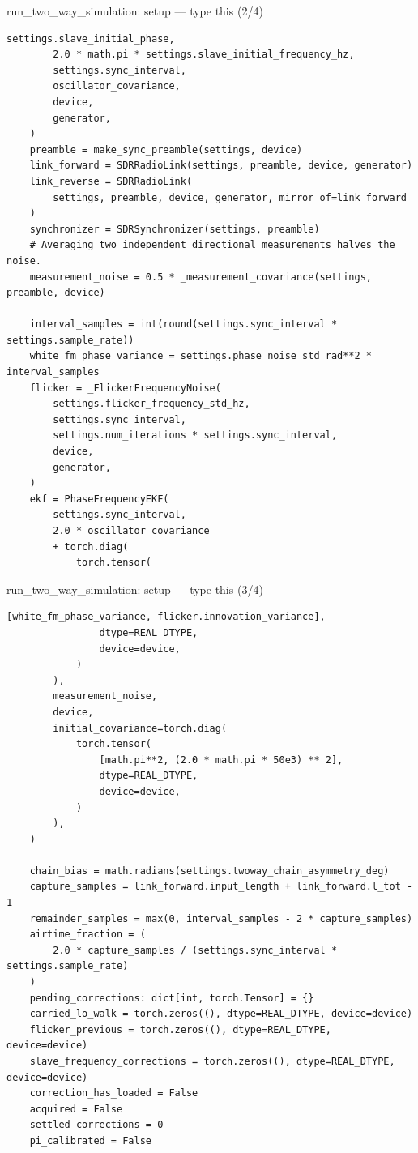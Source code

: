 \documentclass[10pt]{beamer}
\begin{document}
\begin{frame}[fragile]{run\_two\_way\_simulation: setup --- type this (2/4)}
\begin{lstlisting}[basicstyle=\ttfamily\tiny]
        settings.slave_initial_phase,
        2.0 * math.pi * settings.slave_initial_frequency_hz,
        settings.sync_interval,
        oscillator_covariance,
        device,
        generator,
    )
    preamble = make_sync_preamble(settings, device)
    link_forward = SDRRadioLink(settings, preamble, device, generator)
    link_reverse = SDRRadioLink(
        settings, preamble, device, generator, mirror_of=link_forward
    )
    synchronizer = SDRSynchronizer(settings, preamble)
    # Averaging two independent directional measurements halves the noise.
    measurement_noise = 0.5 * _measurement_covariance(settings, preamble, device)

    interval_samples = int(round(settings.sync_interval * settings.sample_rate))
    white_fm_phase_variance = settings.phase_noise_std_rad**2 * interval_samples
    flicker = _FlickerFrequencyNoise(
        settings.flicker_frequency_std_hz,
        settings.sync_interval,
        settings.num_iterations * settings.sync_interval,
        device,
        generator,
    )
    ekf = PhaseFrequencyEKF(
        settings.sync_interval,
        2.0 * oscillator_covariance
        + torch.diag(
            torch.tensor(
\end{lstlisting}
\end{frame}

\begin{frame}[fragile]{run\_two\_way\_simulation: setup --- type this (3/4)}
\begin{lstlisting}[basicstyle=\ttfamily\tiny]
                [white_fm_phase_variance, flicker.innovation_variance],
                dtype=REAL_DTYPE,
                device=device,
            )
        ),
        measurement_noise,
        device,
        initial_covariance=torch.diag(
            torch.tensor(
                [math.pi**2, (2.0 * math.pi * 50e3) ** 2],
                dtype=REAL_DTYPE,
                device=device,
            )
        ),
    )

    chain_bias = math.radians(settings.twoway_chain_asymmetry_deg)
    capture_samples = link_forward.input_length + link_forward.l_tot - 1
    remainder_samples = max(0, interval_samples - 2 * capture_samples)
    airtime_fraction = (
        2.0 * capture_samples / (settings.sync_interval * settings.sample_rate)
    )
    pending_corrections: dict[int, torch.Tensor] = {}
    carried_lo_walk = torch.zeros((), dtype=REAL_DTYPE, device=device)
    flicker_previous = torch.zeros((), dtype=REAL_DTYPE, device=device)
    slave_frequency_corrections = torch.zeros((), dtype=REAL_DTYPE, device=device)
    correction_has_loaded = False
    acquired = False
    settled_corrections = 0
    pi_calibrated = False
\end{lstlisting}
\end{frame}
\end{document}
